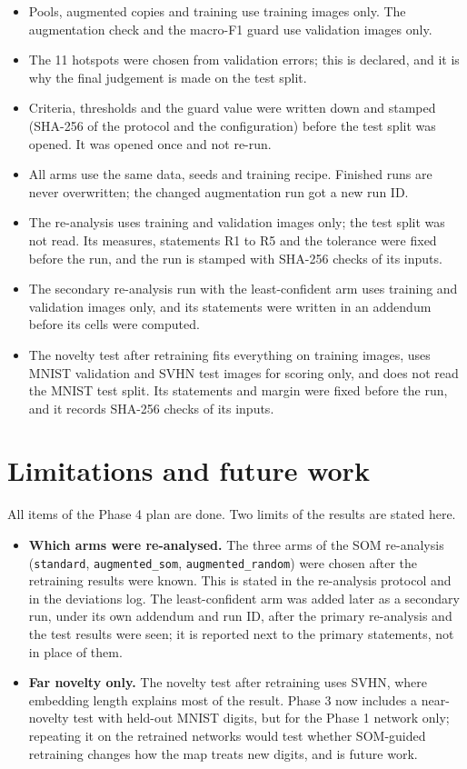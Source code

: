 \documentclass[11pt]{article}
\begin{document}
\begin{itemize}[leftmargin=1.4em, itemsep=1pt]
  \item Pools, augmented copies and training use training images only. The augmentation check and the macro-F1 guard use validation images only.
  \item The 11 hotspots were chosen from validation errors; this is declared, and it is why the final judgement is made on the test split.
  \item Criteria, thresholds and the guard value were written down and stamped (SHA-256 of the protocol and the configuration) before the test split was opened. It was opened once and not re-run.
  \item All arms use the same data, seeds and training recipe. Finished runs are never overwritten; the changed augmentation run got a new run ID.
  \item The re-analysis uses training and validation images only; the test split was not read. Its measures, statements R1 to R5 and the tolerance were fixed before the run, and the run is stamped with SHA-256 checks of its inputs.
  \item The secondary re-analysis run with the least-confident arm uses training and validation images only, and its statements were written in an addendum before its cells were computed.
  \item The novelty test after retraining fits everything on training images, uses MNIST validation and SVHN test images for scoring only, and does not read the MNIST test split. Its statements and margin were fixed before the run, and it records SHA-256 checks of its inputs.
\end{itemize}

\section{Limitations and future work}\label{sec:open}

All items of the Phase 4 plan are done. Two limits of the results are stated here.

\begin{itemize}[leftmargin=1.4em, itemsep=2pt]
  \item \textbf{Which arms were re-analysed.} The three arms of the SOM re-analysis (\texttt{standard}, \texttt{augmented\_som}, \texttt{augmented\_random}) were chosen after the retraining results were known. This is stated in the re-analysis protocol and in the deviations log. The least-confident arm was added later as a secondary run, under its own addendum and run ID, after the primary re-analysis and the test results were seen; it is reported next to the primary statements, not in place of them.
  \item \textbf{Far novelty only.} The novelty test after retraining uses SVHN, where embedding length explains most of the result. Phase 3 now includes a near-novelty test with held-out MNIST digits, but for the Phase 1 network only; repeating it on the retrained networks would test whether SOM-guided retraining changes how the map treats new digits, and is future work.
\end{itemize}
\end{document}
